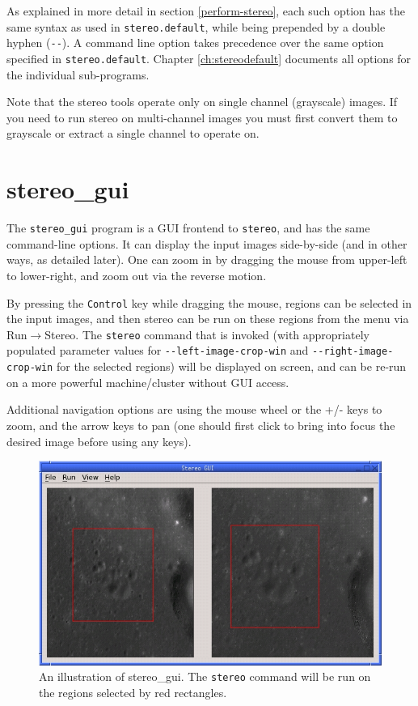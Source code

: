 As explained in more detail
in section \ref{perform-stereo}, each such option has the same syntax as
used in \texttt{stereo.default}, while being prepended by a double hyphen
(\texttt{-\/-}).  A command line option takes precedence over the same
option specified in \texttt{stereo.default}. Chapter \ref{ch:stereodefault}
documents all options for the individual sub-programs.

Note that the stereo tools operate only on single channel (grayscale) images.
If you need to run stereo on multi-channel images you must first convert them
to grayscale or extract a single channel to operate on.

\section{stereo\_gui}
\label{stereo_gui}

The \texttt{stereo\_gui} program is a GUI frontend to \texttt{stereo},
and has the same command-line options. It can display the input images
side-by-side (and in other ways, as detailed later). One can zoom in by
dragging the mouse from upper-left to lower-right, and zoom out via the
reverse motion.

By pressing the \texttt{Control} key while dragging the mouse, regions
can be selected in the input images, and then stereo can be run on these
regions from the menu via Run$\rightarrow$Stereo. The \texttt{stereo}
command that is invoked (with appropriately populated parameter values
for \texttt{-\/-left-image-crop-win} and \texttt{-\/-right-image-crop-win}
for the selected regions) will
be displayed on screen, and can be re-run on a more powerful
machine/cluster without GUI access.

Additional navigation options are using the mouse wheel or the +/- keys to
zoom, and the arrow keys to pan (one should first click to bring into
focus the desired image before using any keys).

\begin{figure}[h!]
\begin{center}
\includegraphics[width=5in]{images/stereo_gui.jpg}
\caption[asp\_gui]{An illustration of stereo\_gui. The \texttt{stereo} command
will be run on the regions selected by red rectangles.}
\label{asp_gui_fig}
\end{center}
\end{figure}

